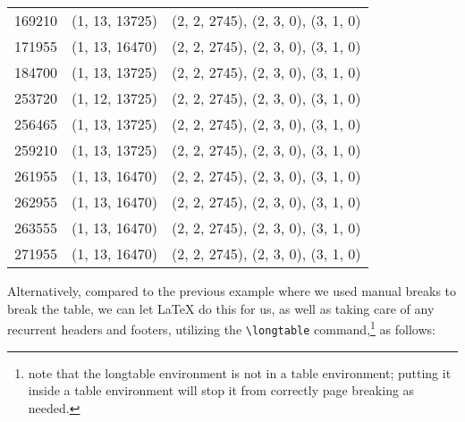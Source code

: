 \begin{table}[h!t!]
\begin{tabularx}{6.5 in}{r l X}
169210 & (1, 13, 13725) & (2, 2, 2745), (2, 3, 0), (3, 1, 0) \\
171955 & (1, 13, 16470) & (2, 2, 2745), (2, 3, 0), (3, 1, 0) \\
184700 & (1, 13, 13725) & (2, 2, 2745), (2, 3, 0), (3, 1, 0) \\
253720 & (1, 12, 13725) & (2, 2, 2745), (2, 3, 0), (3, 1, 0) \\
256465 & (1, 13, 13725) & (2, 2, 2745), (2, 3, 0), (3, 1, 0) \\
259210 & (1, 13, 13725) & (2, 2, 2745), (2, 3, 0), (3, 1, 0) \\
261955 & (1, 13, 16470) & (2, 2, 2745), (2, 3, 0), (3, 1, 0) \\
262955 & (1, 13, 16470) & (2, 2, 2745), (2, 3, 0), (3, 1, 0) \\
263555 & (1, 13, 16470) & (2, 2, 2745), (2, 3, 0), (3, 1, 0) \\
271955 & (1, 13, 16470) & (2, 2, 2745), (2, 3, 0), (3, 1, 0) \\

\hline
\end{tabularx}
\end{table}

Alternatively, compared to the previous example where we used manual breaks to break the table, we can let LaTeX do this for us, as well as taking care of any recurrent headers and footers, utilizing the \verb|\longtable| command,\footnote{note that the longtable environment is not in a table environment; putting it inside a table environment will stop it from correctly page breaking as needed.} as follows:

\clearpage

